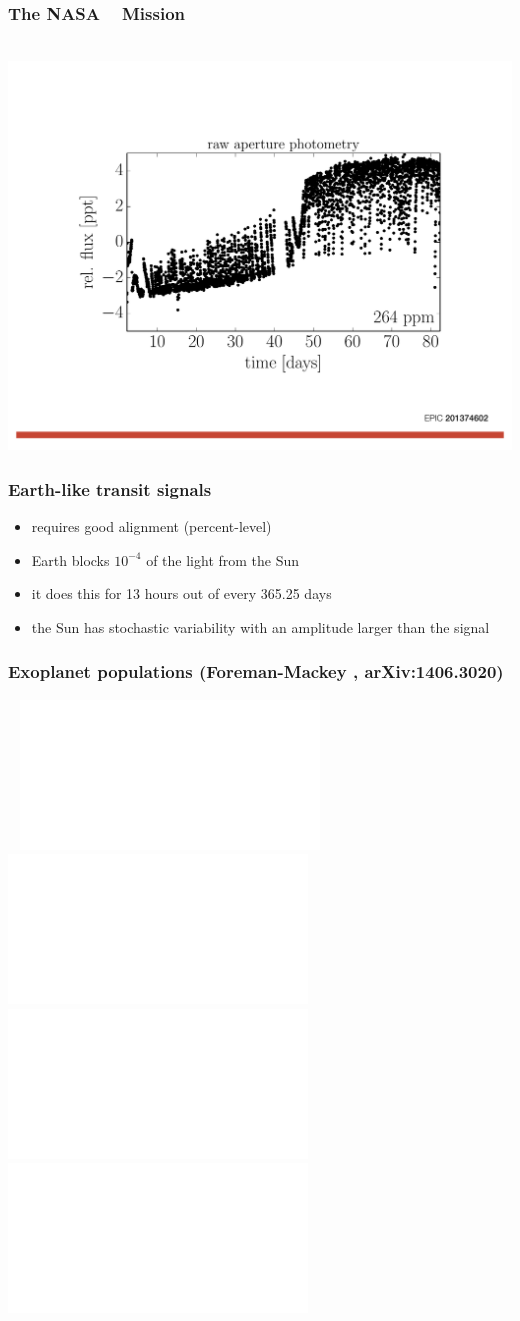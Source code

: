 \documentclass[pdftex]{beamer}
\begin{document}
\begin{frame}
  \frametitle{The NASA \kepler\  Mission}
  ~\hfill
  \includegraphics[trim=100 100 100 100, clip, height=\figureheight]{brownbag/brownbagp10.pdf}
\end{frame}

\begin{frame}
  \frametitle{Earth-like transit signals}
  \begin{itemize}
  \item requires good alignment (percent-level)
  \item Earth blocks $10^{-4}$ of the light from the Sun
  \item it does this for 13 hours out of every 365.25 days
  \item the Sun has stochastic variability with an amplitude larger than the signal
  \end{itemize}
\end{frame}

\begin{frame}
  \frametitle{Exoplanet populations {\footnotesize (Foreman-Mackey \etal, arXiv:1406.3020)}}
  ~\hfill
  \includegraphics<1>[height=\figureheight]{1406.3020/results-results.pdf}
  \includegraphics<2>[height=\figureheight]{1406.3020/results-period.pdf}
  \includegraphics<3>[height=\figureheight]{1406.3020/results-radius.pdf}
  \includegraphics<4>[height=\figureheight]{1406.3020/results-rate.pdf}
\end{frame}
\end{document}
